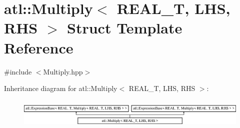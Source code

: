 \hypertarget{structatl_1_1_multiply}{\section{atl\+:\+:Multiply$<$ R\+E\+A\+L\+\_\+\+T, L\+H\+S, R\+H\+S $>$ Struct Template Reference}
\label{structatl_1_1_multiply}
}


{\ttfamily \#include $<$Multiply.\+hpp$>$}

Inheritance diagram for atl\+:\+:Multiply$<$ R\+E\+A\+L\+\_\+\+T, L\+H\+S, R\+H\+S $>$\+:\begin{figure}[H]
\begin{center}
\leavevmode
\includegraphics[height=1.439589cm]{structatl_1_1_multiply}
\end{center}
\end{figure}
